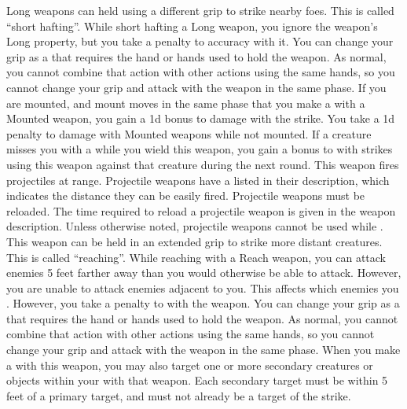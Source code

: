             Long weapons can held using a different grip to strike nearby foes.
            This is called ``short hafting''.
            While short hafting a Long weapon, you ignore the weapon's Long property, but you take a  penalty to accuracy with it.
            You can change your grip as a  that requires the hand or hands used to hold the weapon.
            As normal, you cannot combine that action with other actions using the same hands, so you cannot change your grip and attack with the weapon in the same phase.
            \label{Mounted Weapon} If you are mounted, and mount moves in the same phase that you make a  with a Mounted weapon, you gain a \plus1d bonus to damage with the strike.
            You take a \minus1d penalty to damage with Mounted weapons while not mounted.
             If a creature misses you with a  while you wield this weapon, you gain a  bonus to  with strikes using this weapon against that creature during the next round.
             This weapon fires projectiles at range. Projectile weapons have a  listed in their description, which indicates the distance they can be easily fired. Projectile weapons must be reloaded. The time required to reload a projectile weapon is given in the weapon description.
            Unless otherwise noted, projectile weapons cannot be used while \prone.
            \label{Reach Weapon} This weapon can be held in an extended grip to strike more distant creatures.
            This is called ``reaching''.
            While reaching with a Reach weapon, you can attack enemies 5 feet farther away than you would otherwise be able to attack.
            However, you are unable to attack enemies adjacent to you.
            This affects which enemies you .
            However, you take a  penalty to  with the weapon.
            You can change your grip as a  that requires the hand or hands used to hold the weapon.
            As normal, you cannot combine that action with other actions using the same hands, so you cannot change your grip and attack with the weapon in the same phase.
             When you make a  with this weapon, you may also target one or more secondary creatures or objects within your  with that weapon.
            Each secondary target must be within 5 feet of a primary target, and must not already be a target of the strike.
